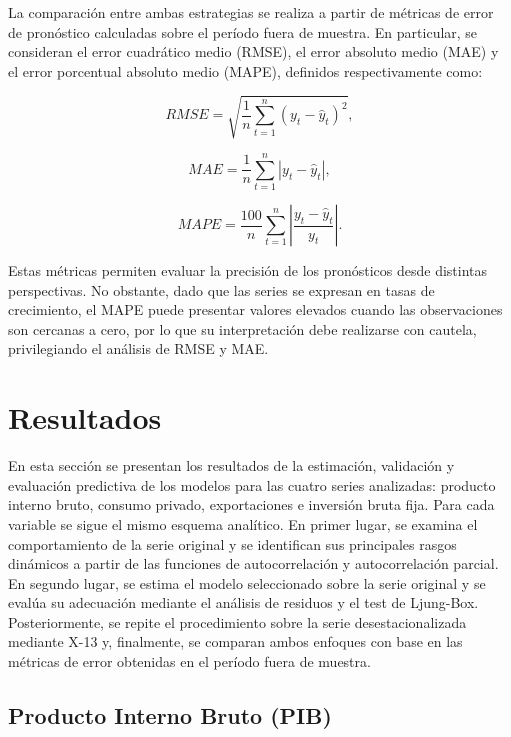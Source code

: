 \documentclass[12pt,a4paper]{article}
\begin{document}
	La comparación entre ambas estrategias se realiza a partir de métricas de error de pronóstico calculadas sobre el período fuera de muestra. En particular, se consideran el error cuadrático medio (RMSE), el error absoluto medio (MAE) y el error porcentual absoluto medio (MAPE), definidos respectivamente como:
	
	\begin{equation}
		RMSE = \sqrt{\frac{1}{n} \sum_{t=1}^{n} (y_t - \hat{y}_t)^2},
	\end{equation}
	
	\begin{equation}
		MAE = \frac{1}{n} \sum_{t=1}^{n} |y_t - \hat{y}_t|,
	\end{equation}
	
	\begin{equation}
		MAPE = \frac{100}{n} \sum_{t=1}^{n} \left| \frac{y_t - \hat{y}_t}{y_t} \right|.
	\end{equation}
	
	Estas métricas permiten evaluar la precisión de los pronósticos desde distintas perspectivas. No obstante, dado que las series se expresan en tasas de crecimiento, el MAPE puede presentar valores elevados cuando las observaciones son cercanas a cero, por lo que su interpretación debe realizarse con cautela, privilegiando el análisis de RMSE y MAE.
	
	\section{Resultados}
	
	En esta sección se presentan los resultados de la estimación, validación y evaluación predictiva de los modelos para las cuatro series analizadas: producto interno bruto, consumo privado, exportaciones e inversión bruta fija. Para cada variable se sigue el mismo esquema analítico. En primer lugar, se examina el comportamiento de la serie original y se identifican sus principales rasgos dinámicos a partir de las funciones de autocorrelación y autocorrelación parcial. En segundo lugar, se estima el modelo seleccionado sobre la serie original y se evalúa su adecuación mediante el análisis de residuos y el test de Ljung-Box. Posteriormente, se repite el procedimiento sobre la serie desestacionalizada mediante X-13 y, finalmente, se comparan ambos enfoques con base en las métricas de error obtenidas en el período fuera de muestra.
	
	\subsection{Producto Interno Bruto (PIB)}
	
\end{document}
